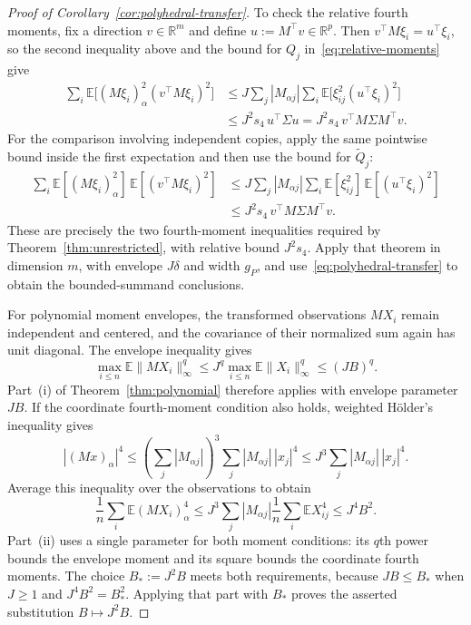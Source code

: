 \documentclass[11pt,letterpaper]{article}
\theoremstyle{remark}
\newcommand{\E}{\mathbb E}
\newcommand{\R}{\mathbb R}
\begin{document}
\begin{proof}[Proof of Corollary~\ref{cor:polyhedral-transfer}]
To check the relative fourth moments, fix a direction $v\in\R^m$
and define $u:=M^\top v\in\R^p$. Then
$v^\top M\xi_i=u^\top\xi_i$, so the second inequality above and
the bound for $Q_j$ in~\eqref{eq:relative-moments} give
\[
 \begin{aligned}
 \sum_i\E\bigl[(M\xi_i)_\alpha^2(v^\top M\xi_i)^2\bigr]
 &\le J\sum_j|M_{\alpha j}|
           \sum_i\E\bigl[\xi_{ij}^2(u^\top\xi_i)^2\bigr]\\
 &\le J^2s_4\,u^\top\Sigma u
 =J^2s_4\,v^\top M\Sigma M^\top v.
 \end{aligned}
\]
For the comparison involving independent copies, apply the same
pointwise bound inside the first expectation and then use the bound
for $\widetilde Q_j$:
\[
 \begin{aligned}
 \sum_i\E[(M\xi_i)_\alpha^2]\,\E[(v^\top M\xi_i)^2]
 &\le J\sum_j|M_{\alpha j}|
             \sum_i\E[\xi_{ij}^2]\,\E[(u^\top\xi_i)^2]\\
 &\le J^2s_4\,v^\top M\Sigma M^\top v.
 \end{aligned}
\]
These are precisely the two fourth-moment inequalities required by
Theorem~\ref{thm:unrestricted}, with relative bound $J^2s_4$.
Apply that theorem in dimension $m$, with envelope $J\delta$ and
width $g_P$, and use~\eqref{eq:polyhedral-transfer} to obtain the
bounded-summand conclusions.

For polynomial moment envelopes, the transformed observations $MX_i$
remain independent and centered, and the covariance of their normalized
sum again has unit diagonal. The envelope inequality gives
\[
 \max_{i\le n}\E\|MX_i\|_\infty^q
 \le J^q\max_{i\le n}\E\|X_i\|_\infty^q\le(JB)^q.
\]
Part~\textup{(i)} of Theorem~\ref{thm:polynomial} therefore applies
with envelope parameter $JB$.
If the coordinate fourth-moment condition also holds, weighted
H\"older's inequality gives
\[
 |(Mx)_\alpha|^4
 \le\left(\sum_j|M_{\alpha j}|\right)^3
          \sum_j|M_{\alpha j}|\,|x_j|^4
 \le J^3\sum_j|M_{\alpha j}|\,|x_j|^4.
\]
Average this inequality over the observations to obtain
\[
 \frac1n\sum_i\E(MX_i)_\alpha^4
 \le J^3\sum_j|M_{\alpha j}|
               \frac1n\sum_i\E X_{ij}^4
 \le J^4B^2.
\]
Part~\textup{(ii)} uses a single parameter for both moment conditions:
its $q$th power bounds the envelope moment and its square bounds the
coordinate fourth moments. The choice $B_*:=J^2B$ meets both
requirements, because $JB\le B_*$ when $J\ge1$ and
$J^4B^2=B_*^2$.
Applying that part with $B_*$ proves the asserted substitution
$B\mapsto J^2B$.


\end{proof}
\end{document}
